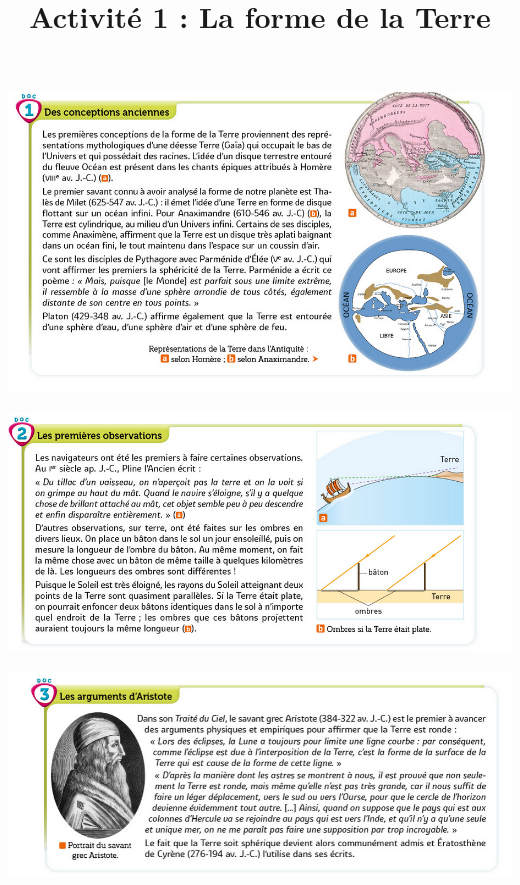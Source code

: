 \documentclass[10pt]{article}
\newcommand{\titreActivite}{Activité 1 : La forme de la Terre} %
\newcommand{\myscale}{0.57}
\begin{document}
\date{}
\title{\titreActivite}
\maketitle %


\begin{center}
	\includegraphics[scale=\myscale]{assets/d1.png}

	\includegraphics[scale=\myscale]{assets/d2.png}

	\includegraphics[scale=\myscale]{assets/d3.png}


\end{center}
\end{document}
